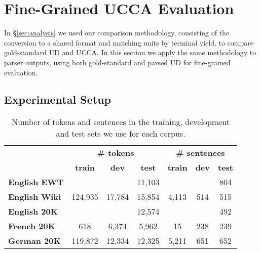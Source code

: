 \documentclass[11pt,a4paper]{article}
\begin{document}
\section{Fine-Grained UCCA Evaluation}\label{sec:fine_grained}

In \S\ref{sec:analysis} we used our comparison methodology,
consisting of the conversion to a shared format and matching units by terminal yield,
to compare gold-standard UD and UCCA.
In this section we apply the same methodology to parser outputs,
using both gold-standard and parsed UD for fine-grained evaluation.

\subsection{Experimental Setup}\label{sec:experiments}

\begin{table}[t]
\centering
\small
\setlength\tabcolsep{2pt}
\begin{tabular}{l|ccc|ccc}
& \multicolumn{3}{c|}{\footnotesize \bf {\#} tokens}
& \multicolumn{3}{c}{\footnotesize \bf {\#} sentences} \\
& \footnotesize \bf train & \footnotesize \bf dev & \footnotesize \bf test
& \footnotesize \bf train & \footnotesize \bf dev & \footnotesize \bf test \\
\hline
\bf English EWT &&& 11,103 &&& 804 \\
\bf English Wiki & 124,935 & 17,784 & 15,854 & 4,113 & 514 & 515 \\
\bf English 20K &&& 12,574 &&& 492 \\
\bf French 20K & 618 & 6,374 & 5,962 & 15 & 238 & 239 \\
\bf German 20K & 119,872 & 12,334 & 12,325 & 5,211 & 651 & 652
\end{tabular}
\caption{Number of tokens and sentences in the training, development and test sets
we use for each corpus.
\label{tab:corpora}}
\end{table}
\end{document}
